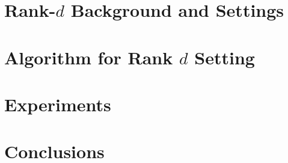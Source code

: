 \documentclass{article}
\begin{document}
\section{Rank-$d$ Background and Settings}
\label{sec:setting}



\section{Algorithm for Rank $d$ Setting}
\label{sec:algorithm}



\section{Experiments}
\label{sec:experiments}


%

\section{Conclusions}
\label{sec:conclusions}





%
\end{document}
